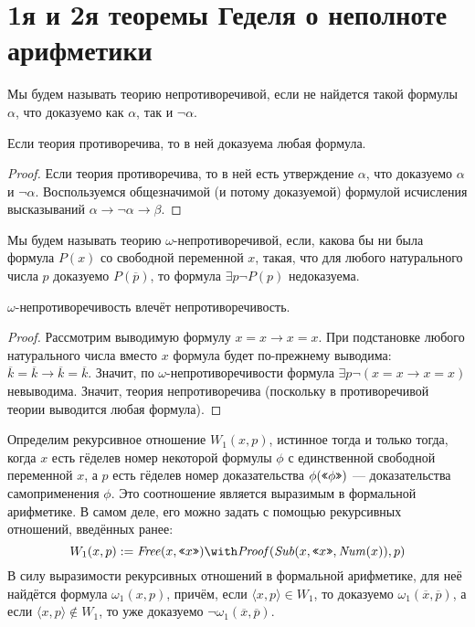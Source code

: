 \section{1я и 2я теоремы Геделя о неполноте арифметики}

\begin{definition}Мы будем называть теорию непротиворечивой, если
не найдется такой формулы $\alpha$, что доказуемо как $\alpha$, так и $\neg \alpha$.
\end{definition}

\begin{lemma}
Если теория противоречива, то в ней доказуема любая формула.
\end{lemma}
\begin{proof}
Если теория противоречива, то в ней есть утверждение $\alpha$, что доказуемо $\alpha$ и $\neg \alpha$.
Воспользуемся общезначимой (и потому доказуемой) формулой исчисления высказываний 
$\alpha \rightarrow \neg \alpha \rightarrow \beta$.
\end{proof}

\begin{definition}Мы будем называть теорию $\omega$-непротиворечивой,
если, какова бы ни была формула $P(x)$ со свободной переменной $x$, 
такая, что для любого натурального числа $p$ доказуемо $P(\overline{p})$, 
то формула $\exists p \neg P(p)$ недоказуема.
\end{definition}

\begin{lemma}
$\omega$-непротиворечивость влечёт непротиворечивость.
\end{lemma}

\begin{proof}
Рассмотрим выводимую формулу $x=x \rightarrow x=x$.
При подстановке любого натурального числа вместо $x$
формула будет по-прежнему выводима: $\overline{k} = \overline{k} \rightarrow \overline{k}=\overline{k}$.
Значит, по $\omega$-непротиворечивости формула $\exists p \neg (x=x \rightarrow x=x)$ невыводима.
Значит, теория непротиворечива (поскольку в противоречивой теории выводится любая формула).
\end{proof}

Определим рекурсивное отношение $W_1(x,p)$,
истинное тогда и только тогда, когда $x$ есть гёделев номер некоторой формулы
$\phi$ с единственной свободной переменной $x$, а $p$ есть гёделев номер 
доказательства $\phi(\texttt{<<}\phi\texttt{>>})$ --- доказательства 
самоприменения $\phi$. 
Это соотношение является выразимым в формальной арифметике. В самом деле, его можно задать
с помощью рекурсивных отношений, введённых ранее:
$$W_1(x,p) := \mathit{Free}(x,\gq{x}) \with \mathit{Proof} (\mathit{Sub}(x,\gq{x},\mathit{Num}(x)),p)$$
В силу выразимости рекурсивных отношений в формальной арифметике, для неё найдётся 
формула $\omega_1(x,p)$, причём, если $\langle x, p \rangle \in W_1$, то 
доказуемо $\omega_1(\overline{x},\overline{p})$, а если $\langle x, p \rangle \notin W_1$, то уже 
доказуемо $\neg\omega_1(\overline{x},\overline{p})$.

